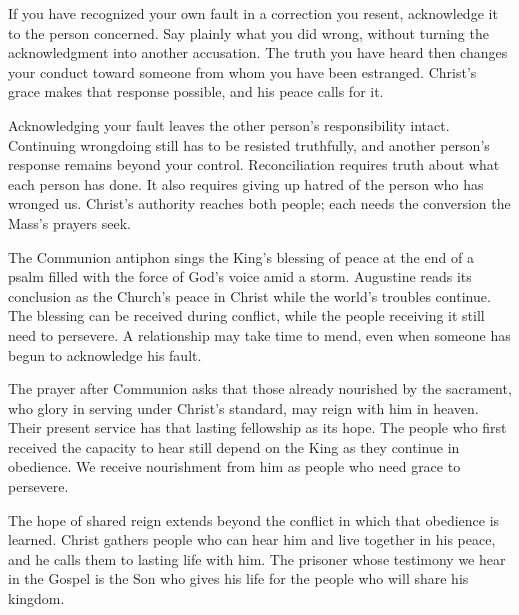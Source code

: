 If you have recognized your own fault in a correction you resent, acknowledge it to the person concerned. Say plainly what you did wrong, without turning the acknowledgment into another accusation. The truth you have heard then changes your conduct toward someone from whom you have been estranged. Christ's grace makes that response possible, and his peace calls for it.

Acknowledging your fault leaves the other person's responsibility intact. Continuing wrongdoing still has to be resisted truthfully, and another person's response remains beyond your control. Reconciliation requires truth about what each person has done. It also requires giving up hatred of the person who has wronged us. Christ's authority reaches both people; each needs the conversion the Mass's prayers seek.

The Communion antiphon sings the King's blessing of peace at the end of a psalm filled with the force of God's voice amid a storm. Augustine reads its conclusion as the Church's peace in Christ while the world's troubles continue. The blessing can be received during conflict, while the people receiving it still need to persevere. A relationship may take time to mend, even when someone has begun to acknowledge his fault.

The prayer after Communion asks that those already nourished by the sacrament, who glory in serving under Christ's standard, may reign with him in heaven. Their present service has that lasting fellowship as its hope. The people who first received the capacity to hear still depend on the King as they continue in obedience. We receive nourishment from him as people who need grace to persevere.

The hope of shared reign extends beyond the conflict in which that obedience is learned. Christ gathers people who can hear him and live together in his peace, and he calls them to lasting life with him. The prisoner whose testimony we hear in the Gospel is the Son who gives his life for the people who will share his kingdom.
